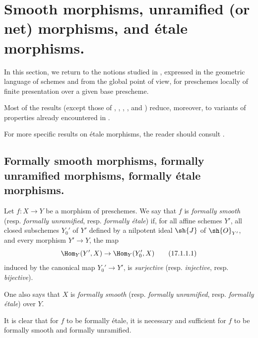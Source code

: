 \section{Smooth morphisms, unramified (or net) morphisms, and \'etale morphisms.}
\label{section:IV.17}

In this section, we return to the notions studied in , expressed in the geometric language of schemes and from the global point of view, for preschemes locally of finite presentation over a given base prescheme.

Most of the results (except those of , , , , and ) reduce, moreover, to variants of properties already encountered in .

For more specific results on \'etale morphisms, the reader should consult .

\subsection{Formally smooth morphisms, formally unramified morphisms, formally \'etale morphisms.}
\label{subsection:IV.17.1}

\begin{definition}[17.1.1]
\label{IV.17.1.1}
Let $f:X\to Y$ be a morphism of preschemes.
We say that $f$ is \emph{formally smooth} (resp. \emph{formally unramified}, resp. \emph{formally \'etale}) if, for all affine schemes $Y'$, all closed subschemes $Y_0'$ of $Y'$ defined by a nilpotent ideal $\sh{J}$ of $\sh{O}_{Y'}$, and every morphism $Y'\to Y$, the map 
\[
\label{IV.17.1.1.1}
  \Hom_Y(Y',X)\to\Hom_Y(Y_0',X)
  \tag{17.1.1.1}
\]
induced by the canonical map $Y_0'\to Y'$, is \emph{surjective} (resp. \emph{injective}, resp. \emph{bijective}).

One also says that $X$ is \emph{formally smooth} (resp. \emph{formally unramified}, resp. \emph{formally \'etale}) over $Y$.

It is clear that for $f$ to be formally \'etale, it is necessary and sufficient for $f$ to be formally smooth and formally unramified.
\end{definition}

